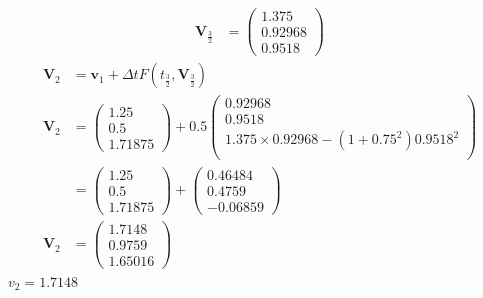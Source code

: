 \documentclass[12pt,a4paper]{article}
\begin{document}
\begin{itemize}
\begin{align*}
\textbf{V}_{\frac{3}{2}}	&=\begin{pmatrix}
	1.375\\
	0.92968\\
	0.9518
	\end{pmatrix}
	\end{align*}
	\begin{align*}
	\textbf{V}_{2}&=\textbf{v}_{1}+\Delta t F(t_{\frac{3}{2}},\textbf{V}_{\frac{3}{2}})\\
	\textbf{V}_{2}&=\begin{pmatrix}
	1.25\\
	0.5\\
	1.71875
	\end{pmatrix} +0.5\begin{pmatrix}
	0.92968\\
	0.9518\\
	1.375\times 0.92968-(1+0.75^{2})0.9518^{2}\\
	\end{pmatrix}\\
	&=\begin{pmatrix}
	1.25\\
	0.5\\
	1.71875
	\end{pmatrix} + \begin{pmatrix}
	0.46484\\
	0.4759\\
	-0.06859
	\end{pmatrix}\\
	\textbf{V}_{2}&=\begin{pmatrix}
	1.7148\\
	0.9759\\
	1.65016
	\end{pmatrix}
	\end{align*}
	$v_{2}=1.7148$
\end{itemize}
\newpage
\end{document}
